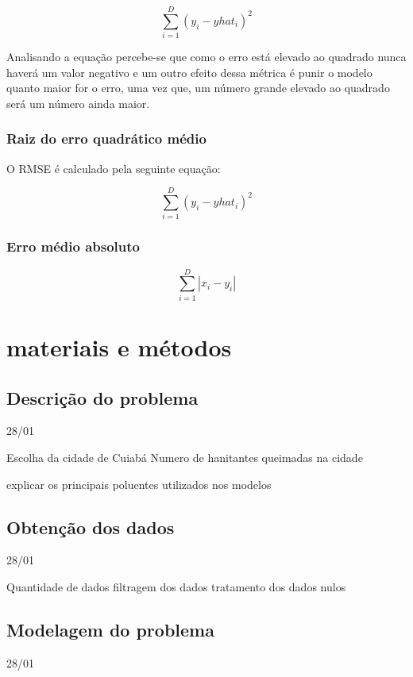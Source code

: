 \documentclass[
  12pt,		%
  a4paper,	%
  openright,%
  oneside,	%
  chapter=TITLE,		%
  section=TITLE,		%
  english,	%
  french,	%
  spanish,	%
  brazil	%
]{abntex2}
\begin{document}
    \begin{equation}
        \sum_{i=1}^{D}(y_i-yhat_i)^2
    \end{equation}

    Analisando a equação percebe-se que como o erro está elevado ao quadrado nunca haverá um valor negativo e
    um outro efeito dessa métrica é punir o modelo quanto maior for o erro, uma vez que, um número grande elevado ao quadrado
    será um número ainda maior.
    
    \subsection{Raiz do erro quadrático médio}
    O RMSE é calculado pela seguinte equação: 

    \begin{equation}
        \sum_{i=1}^{D}(y_i-yhat_i)^2
    \end{equation}
    \subsection{Erro médio absoluto}
    
    \begin{equation}
        \sum_{i=1}^{D}|x_i-y_i|
    \end{equation}
    
    \chapter{materiais e métodos}

    \section{Descrição do problema}
    28/01

    Escolha da cidade de Cuiabá
    Numero de hanitantes
    queimadas na cidade

    explicar os principais poluentes utilizados nos modelos
    \section{Obtenção dos dados}
    28/01

    Quantidade de dados
    filtragem dos dados
    tratamento dos dados nulos
    \section{Modelagem do problema}
    28/01
\end{document}
